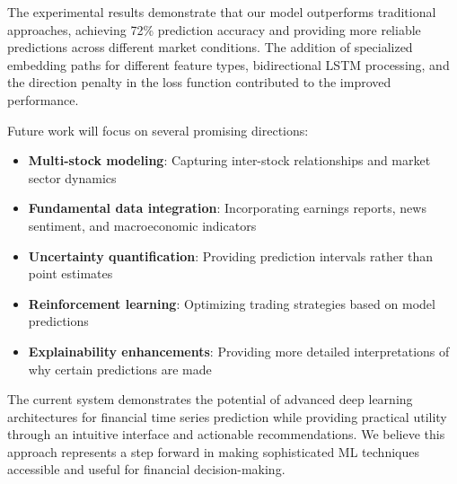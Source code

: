 \documentclass[conference]{IEEEtran}
\begin{document}
The experimental results demonstrate that our model outperforms traditional approaches, achieving 72\% prediction accuracy and providing more reliable predictions across different market conditions. The addition of specialized embedding paths for different feature types, bidirectional LSTM processing, and the direction penalty in the loss function contributed to the improved performance.

Future work will focus on several promising directions:

\begin{itemize}
\item \textbf{Multi-stock modeling}: Capturing inter-stock relationships and market sector dynamics
\item \textbf{Fundamental data integration}: Incorporating earnings reports, news sentiment, and macroeconomic indicators
\item \textbf{Uncertainty quantification}: Providing prediction intervals rather than point estimates
\item \textbf{Reinforcement learning}: Optimizing trading strategies based on model predictions
\item \textbf{Explainability enhancements}: Providing more detailed interpretations of why certain predictions are made
\end{itemize}

The current system demonstrates the potential of advanced deep learning architectures for financial time series prediction while providing practical utility through an intuitive interface and actionable recommendations. We believe this approach represents a step forward in making sophisticated ML techniques accessible and useful for financial decision-making.
\end{document}
